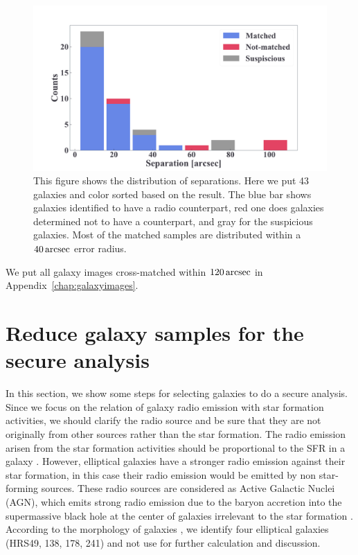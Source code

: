 \begin{figure}[htbp]
	\centering
	\includegraphics[width=.8\linewidth]{Chapter_4/Figures/Method_separation.pdf}
    \caption[Separation from the cross-matching]{\label{fig:separation}
        This figure shows the distribution of separations.
        Here we put 43 galaxies and color sorted based on the result.
        The blue bar shows galaxies identified to have a radio counterpart, red one does galaxies determined not to have a counterpart, and gray for the suspicious galaxies.
        Most of the matched samples are distributed within a $40\,\mathrm{arcsec}$ error radius.
    }
\end{figure}

We put all galaxy images cross-matched within $120\,\mathrm{arcsec}$ in Appendix~\ref{chap:galaxyimages}.



\section{Reduce galaxy samples for the secure analysis}\label{sec:reducegalaxysamples}

In this section, we show some steps for selecting galaxies to do a secure analysis.
Since we focus on the relation of galaxy radio emission with star formation activities, we should clarify the radio source and be sure that they are not originally from other sources rather than the star formation.
The radio emission arisen from the star formation activities should be proportional to the SFR in a galaxy \citep{Condon1992a, Murphy2011}.
However, elliptical galaxies have a stronger radio emission against their star formation, in this case their radio emission would be emitted by non star-forming sources.
These radio sources are considered as Active Galactic Nuclei (AGN), which emits strong radio emission due to the baryon accretion into the supermassive black hole at the center of galaxies irrelevant to the star formation \citep[e.g.,][]{Urry1995, Padovani2017}.
According to the morphology of galaxies \citep{Cortese2012}, we identify four elliptical galaxies (HRS49, 138, 178, 241) and not use for further calculation and discussion.

